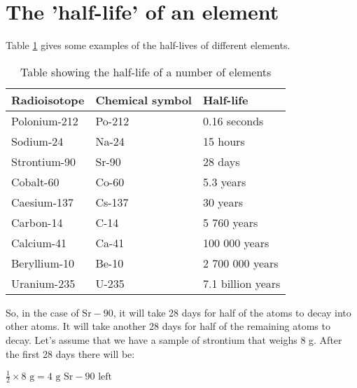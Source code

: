 



\section{The 'half-life' of an element}
\label{sec:an:halflife}


Table \ref{tab:an:r} gives some examples of the half-lives of different elements.\\

\begin{table}[!h]
\begin{center}
\caption{Table showing the half-life of a number of elements}

\begin{tabular}{|l|l|l|}\hline
\textbf{Radioisotope} & \textbf{Chemical symbol} & \textbf{Half-life}\\\hline\hline
Polonium-212 & Po-212 & 0.16 seconds\\\hline
Sodium-24 & Na-24 & 15 hours\\\hline
Strontium-90 & Sr-90 & 28 days\\\hline
Cobalt-60 & Co-60 & 5.3 years\\\hline
Caesium-137 & Cs-137 & 30 years\\\hline
Carbon-14 & C-14 & 5 760 years\\\hline
Calcium-41 & Ca-41 & 100 000 years\\\hline
Beryllium-10 & Be-10 & 2 700 000 years\\\hline
Uranium-235 & U-235 & 7.1 billion years\\\hline\hline
\end{tabular}
\label{tab:an:r}

\end{center}
\end{table}

So, in the case of $\text{Sr}-90$, it will take 28 days for half of the atoms to decay into other atoms. It will take another 28 days for half of the remaining atoms to decay. Let's assume that we have a sample of strontium that weighs 8 g. After the first 28 days there will be:

\begin{center}
$\frac{1}{2} \times 8 \text{ g} = 4 \text{ g Sr}-90 \text{ left}$
\end{center}

